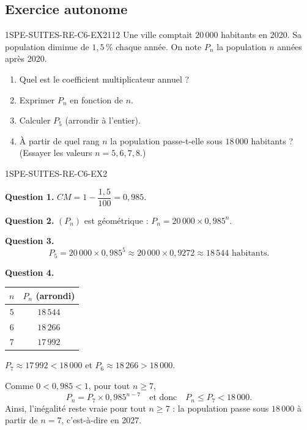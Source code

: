 \subsection*{Exercice autonome}


\begin{exercice}{1SPE-SUITES-RE-C6-EX2}{1}{12}
Une ville comptait $20\,000$ habitants en 2020. Sa population diminue de $1{,}5\,\%$ chaque année. On note $P_n$ la population $n$ années après 2020.
\begin{enumerate}
  \item Quel est le coefficient multiplicateur annuel ?
  \item Exprimer $P_n$ en fonction de $n$.
  \item Calculer $P_5$ (arrondir à l'entier).
  \item À partir de quel rang $n$ la population passe-t-elle sous $18\,000$ habitants ? (Essayer les valeurs $n = 5, 6, 7, 8$.)
\end{enumerate}
\end{exercice}


\begin{corrige}{1SPE-SUITES-RE-C6-EX2}

\textbf{Question 1.} $CM = 1 - \dfrac{1{,}5}{100} = 0{,}985$.

\textbf{Question 2.} $(P_n)$ est géométrique : $P_n = 20\,000 \times 0{,}985^n$.

\textbf{Question 3.}
\[
P_5 = 20\,000 \times 0{,}985^5 \approx 20\,000 \times 0{,}9272 \approx 18\,544 \text{ habitants.}
\]


\textbf{Question 4.}
\begin{center}
\begin{tabular}{|c|c|}
\hline
$n$ & $P_n$ (arrondi) \\
\hline
$5$ & $18\,544$ \\
$6$ & $18\,266$ \\
$7$ & $17\,992$ \\
\hline
\end{tabular}
\end{center}

$P_7 \approx 17\,992 < 18\,000$ et $P_6 \approx 18\,266 > 18\,000$.

Comme $0<0{,}985<1$, pour tout $n\geq 7$,
\[
P_n=P_7\times 0{,}985^{n-7}
\quad\text{et donc}\quad P_n\leq P_7<18\,000.
\]
Ainsi, l'inégalité reste vraie pour tout $n\geq 7$ : la population passe
sous $18\,000$ à partir de $n = 7$, c'est-à-dire en 2027.

\end{corrige}

